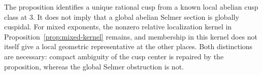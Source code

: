 \begin{remark}\label{rem:affine-packet-scope}
The proposition identifies a unique rational cusp
from a known local abelian cusp class at $3$.
It does not imply that a global abelian Selmer
section is globally cuspidal.  For mixed exponents, the nonzero relative
localization kernel in Proposition~\ref{prop:mixed-kernel} remains,
and membership in this kernel does not itself
give a local geometric representative at the
other places.  Both distinctions are necessary:
compact ambiguity of the cusp center is repaired
by the proposition, whereas the global Selmer
obstruction is not.
\end{remark}

